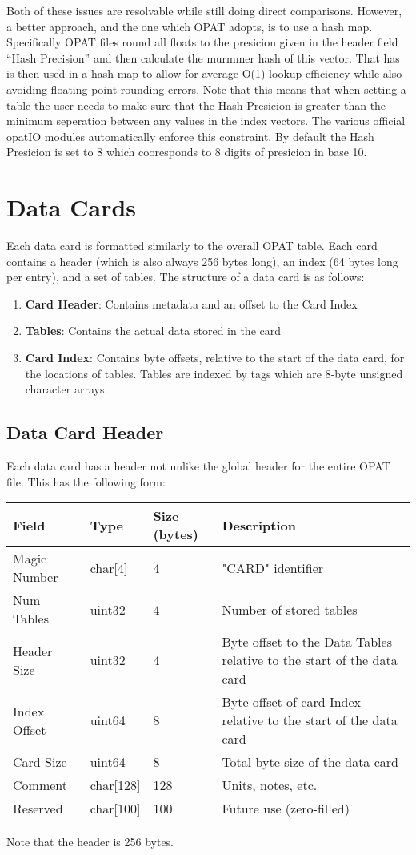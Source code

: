 \documentclass{article}
\begin{document}
Both of these issues are resolvable while still doing direct comparisons.
However, a better approach, and the one which OPAT adopts, is to use a hash
map. Specifically OPAT files round all floats to the presicion given in the
header field ``Hash Precision'' and then calculate the murmmer hash of this
vector. That has is then used in a hash map to allow for average O(1) lookup
efficiency while also avoiding floating point rounding errors. Note that this
means that when setting a table the user needs to make sure that the Hash
Presicion is greater than the minimum seperation between any values in the
index vectors. The various official opatIO modules automatically enforce this
constraint. By default the Hash Presicion is set to 8 which cooresponds to 8
digits of presicion in base 10.

\section{Data Cards}\label{Sec:Cards}
Each data card is formatted similarly to the overall OPAT table.  Each card contains a header (which is also always 256 bytes long), an index (64 bytes long per entry), and a set of tables.  The structure of a data card is as follows: 
\begin{enumerate}
  \item \textbf{Card Header}: Contains metadata and an offset to the Card Index
  \item \textbf{Tables}: Contains the actual data stored in the card
  \item \textbf{Card Index}: Contains byte offsets, relative to the start of the data card, for the locations of tables.  Tables are indexed by tags which are 8-byte unsigned character arrays. 
\end{enumerate}

\subsection{Data Card Header}
Each data card has a header not unlike the global header for the entire OPAT file.  This has the following form: 
\begin{longtable}{|l|l|l|p{5cm}|}
\hline
\textbf{Field} & \textbf{Type} & \textbf{Size (bytes)} & \textbf{Description} \\
\hline
Magic Number & char[4] & 4 & "CARD" identifier \\
Num Tables & uint32 & 4 & Number of stored tables \\
Header Size & uint32 & 4 & Byte offset to the Data Tables relative to the start of the data card \\
Index Offset & uint64 & 8 & Byte offset of card Index relative to the start of the data card \\
Card Size & uint64 & 8 & Total byte size of the data card \\
Comment & char[128] & 128 & Units, notes, etc. \\
Reserved & char[100] & 100 & Future use (zero-filled) \\
\hline
\end{longtable} 
Note that the header is 256 bytes. 
\end{document}
